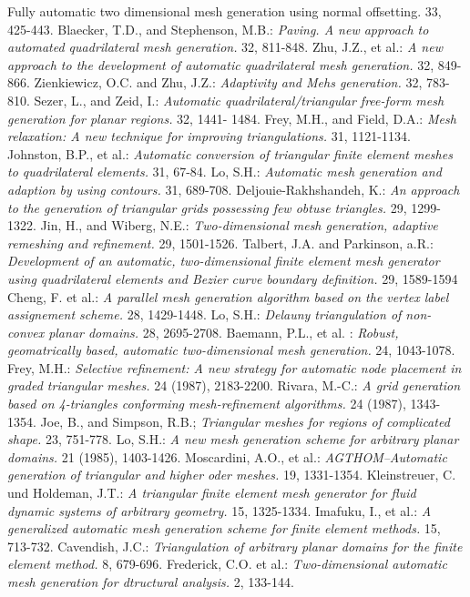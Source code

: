 \documentclass[12pt,a4paper]{article}
\begin{document}
\begin{thebibliography}{\hspace{5mm}}
{Fully automatic two dimensional mesh generation using normal offsetting.}
33, 425-443.
%
 Blaecker, T.D., and Stephenson, M.B.: {\sl
Paving. A new approach to automated quadrilateral mesh generation.}
32, 811-848.
%
 Zhu, J.Z., et al.: {\sl A new approach to the development of
automatic quadrilateral mesh generation.}
32, 849-866.
%
 Zienkiewicz, O.C. and Zhu, J.Z.: {\sl Adaptivity and Mehs
generation.}
32, 783-810.
%
 Sezer, L., and Zeid, I.: {\sl Automatic
quadrilateral/triangular free-form mesh generation for planar regions.}
32, 1441- 1484.
%
 Frey, M.H., and Field, D.A.: {\sl Mesh relaxation: A new
technique for improving triangulations.}
31, 1121-1134.
%
 Johnston, B.P., et al.: {\sl Automatic conversion of
triangular finite element meshes to quadrilateral elements.}
31, 67-84.
%
 Lo, S.H.: {\sl Automatic mesh generation and adaption by
using contours.}
31, 689-708.
%
 Deljouie-Rakhshandeh, K.: {\sl An approach to the generation
of triangular grids possessing few obtuse triangles.}
29, 1299-1322.
%
 Jin, H., and Wiberg, N.E.: {\sl Two-dimensional mesh
generation, adaptive remeshing and refinement.}
29, 1501-1526.
%
 Talbert, J.A. and Parkinson, a.R.: {\sl Development of an
automatic, two-dimensional finite element mesh generator using quadrilateral
elements and Bezier curve boundary definition.}
29, 1589-1594
%
 Cheng, F. et al.: {\sl A parallel mesh generation algorithm
based on the vertex label assignement scheme.}
28, 1429-1448.
%
 Lo, S.H.: {\sl Delauny triangulation of non-convex planar
domains.}
28, 2695-2708.
%
 Baemann, P.L., et al.  :  {\sl Robust, geomatrically based,
automatic two-dimensional mesh generation.}
24, 1043-1078.
%
 Frey, M.H.: {\sl Selective refinement: A new strategy
for automatic node placement in graded triangular meshes.}
24 (1987), 2183-2200.
%
 Rivara, M.-C.: {\sl A grid generation based on 4-triangles
conforming mesh-refinement algorithms.}
24 (1987), 1343-1354.
%
 Joe, B., and Simpson, R.B.; {\sl Triangular meshes for
regions of complicated shape.}
23, 751-778.
%
 Lo, S.H.: {\sl A
new mesh generation scheme for arbitrary planar domains.}
21 (1985), 1403-1426.
%
 Moscardini, A.O., et al.: {\sl AGTHOM--Automatic generation
of triangular and higher oder meshes.}
19, 1331-1354.
%
 Kleinstreuer, C. und Holdeman, J.T.: {\sl A triangular
finite element mesh generator for fluid dynamic systems of arbitrary
geometry.}
15, 1325-1334.
%
 Imafuku, I., et al.: {\sl A generalized automatic
mesh generation scheme for finite element methods.} 15, 713-732.
%
 Cavendish, J.C.: {\sl Triangulation of arbitrary planar
domains for the finite element method.} 8, 679-696.
%
 Frederick, C.O. et
al.: {\sl Two-dimensional automatic mesh generation for dtructural analysis.}
2, 133-144.
%
\end{thebibliography}
%
\end{document}
